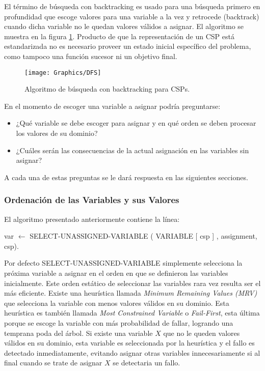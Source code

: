 El t\'ermino de b\'usqueda con backtracking es usado para una b\'usqueda primero en profundidad que escoge valores para una variable a la vez y retrocede (backtrack) cuando dicha variable no le quedan valores v\'alidos a asignar. El algoritmo se muestra en la figura \ref{DFS}. Producto de que la representaci\'on de un CSP est\'a estandarizada no es necesario proveer un estado inicial espec\'ifico del problema, como tampoco una funci\'on sucesor ni un objetivo final.

\begin{figure}
	\begin{center}
		\texttt{[image: Graphics/DFS]}
		\caption{Algoritmo de b\'usqueda con backtracking para CSPs.}
		\label{DFS}
	\end{center}	
\end{figure}

En el momento de escoger una variable a asignar podr\'ia preguntarse:

\begin{itemize}
	\item ¿Qu\'e variable se debe escoger para asignar y en qu\'e orden se deben procesar los valores de su dominio?
	\item ¿Cu\'ales ser\'an las consecuencias de la actual asignaci\'on en las variables sin asignar?
\end{itemize}

A cada una de estas preguntas se le dar\'a respuesta en las siguientes secciones.

\subsubsection{Ordenaci\'on de las Variables y sus Valores}

El algoritmo presentado anteriormente contiene la línea:

\begin{center}
	\scriptsize var $\leftarrow$ SELECT-UNASSIGNED-VARIABLE ( VARIABLE [ csp ] , assignment, csp).
\end{center}

Por defecto SELECT-UNASSIGNED-VARIABLE simplemente selecciona la pr\'oxima variable a asignar en el orden en que se definieron las variables inicialmente. Este orden est\'atico de seleccionar las variables rara vez resulta ser el m\'as eficiente. Existe una heur\'istica llamada \emph{Minimum Remaining Values (MRV)} que selecciona la variable con menos valores v\'alidos en su dominio. Esta heur\'istica es tambi\'en llamada \emph{Most Constrained Variable} o \emph{Fail-First}, esta \'ultima porque se escoge la variable con m\'as probabilidad de fallar, logrando una temprana poda del \'arbol. Si existe una variable $X$ que no le queden valores v\'alidos en su dominio, esta variable es seleccionada por la heur\'istica y el fallo es detectado inmediatamente, evitando asignar otras variables innecesariamente si al final cuando se trate de asignar $X$ se detectaria un fallo.

